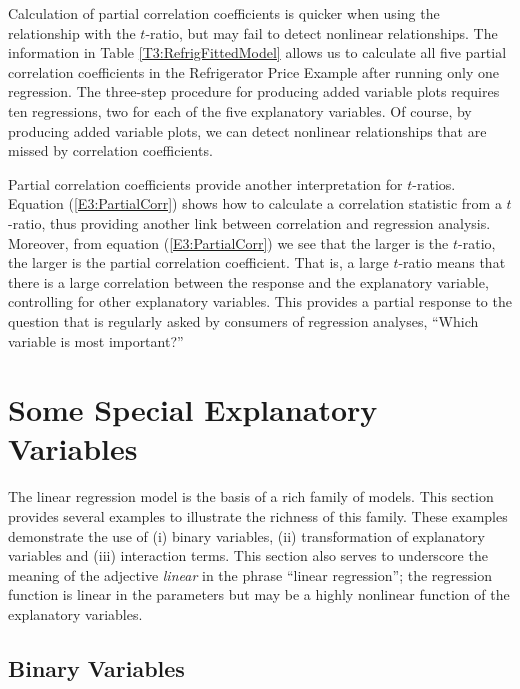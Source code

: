 Calculation of partial correlation coefficients is quicker when
using the relationship with the $t$-ratio, but may fail to detect
nonlinear relationships. The information in Table
\ref{T3:RefrigFittedModel} allows us to calculate all five partial
correlation coefficients in the Refrigerator Price Example after
running only one regression. The three-step procedure for producing
added variable plots requires ten regressions, two for each of the
five explanatory variables. Of course, by producing added variable
plots, we can detect nonlinear relationships that are missed by
correlation coefficients.

Partial correlation coefficients provide another interpretation for
$t$-ratios. Equation (\ref{E3:PartialCorr}) shows how to calculate a
correlation statistic from a $t$-ratio, thus providing another link
between correlation and regression analysis. Moreover, from equation
(\ref{E3:PartialCorr}) we see that the larger is the $t$-ratio, the
larger is the partial correlation coefficient. That is, a large
$t$-ratio means that there is a large correlation between the
response and the explanatory variable, controlling for other
explanatory variables. This provides a partial response to the
question that is regularly asked by consumers of regression
analyses, ``Which variable is most important?''

\section{Some Special Explanatory Variables}

The linear regression model is the basis of a rich family of models.
This section provides several examples to illustrate the richness of
this family. These examples demonstrate the use of (i) binary
variables, (ii) transformation of explanatory variables and (iii)
interaction terms. This section also serves to underscore the
meaning of the adjective \emph{linear} in the phrase ``linear
regression''; the regression function is linear in the parameters
but may be a highly nonlinear function of the explanatory variables.


\subsection{Binary Variables}


